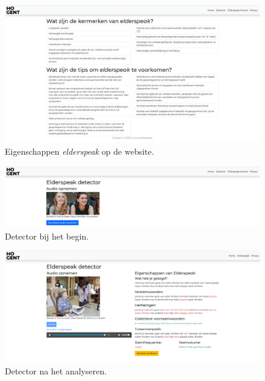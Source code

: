 \begin{figure}
    \centering
    \includegraphics[width=1\textwidth]{./img/eigenschappen_elderspeak_website}
    \caption{\label{fig:eigenschappen_page} Eigenschappen \textit{elderspeak} op de website.}
\end{figure}

\begin{figure}
    \centering
    \includegraphics[width=1\textwidth]{./img/detector_begin_elderspeak}
    \caption{\label{fig:detector_begin_page} Detector bij het begin.}
\end{figure}

\begin{figure}
    \centering
    \includegraphics[width=1\textwidth]{./img/dector_na_detecteren}
    \caption{\label{fig:detector_end_page} Detector na het analyseren.}
\end{figure}


